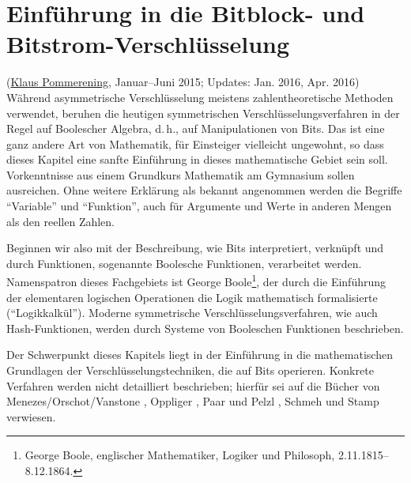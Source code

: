 \begin{refsegment}
\setcounter{satz}{0}
\setcounter{definition}{0}


\newpage %
\hypertarget{Chapter_BitCiphers}{}   %
\chapter{Einführung in die Bitblock- und Bitstrom-Verschlüsselung}
\label{Chapter_BitCiphers}
(\hyperlink{author_Klaus-Pommerening}{Klaus Pommerening},
 Januar--Juni 2015; Updates: Jan. 2016, Apr. 2016) \\

\noindent
Während asymmetrische Verschlüsselung meistens zahlentheoretische Methoden
verwendet, beruhen die heutigen symmetrischen
Verschlüsselungsverfahren
in der Regel auf Boolescher Algebra,
d.\,h., auf Manipulationen von Bits.
Das ist eine ganz andere Art von Mathematik, für Einsteiger vielleicht
ungewohnt, so dass dieses Kapitel eine sanfte Einführung in dieses mathematische
Gebiet sein soll. Vorkenntnisse aus einem Grundkurs Mathematik am Gymnasium
sollen ausreichen. Ohne weitere Erklärung als bekannt
angenommen werden die Begriffe "`Variable"' und "`Funktion"', auch für Argumente
und Werte in anderen Mengen als den reellen Zahlen.

Beginnen wir also mit der Beschreibung, wie Bits interpretiert, verknüpft
und durch Funktionen, sogenannte Boolesche
Funktionen, verarbeitet werden.
Namenspatron dieses Fachgebiets ist
George Boole\footnote{%
  George Boole, englischer Mathematiker, Logiker und Philosoph,
  2.11.1815--8.12.1864.
},
der durch die Einführung der elementaren logischen Operationen die Logik
mathematisch formalisierte ("`Logikkalkül"').
Moderne symmetrische Verschlüsselungsverfahren, wie auch
Hash-Funktionen,
werden durch Systeme von Booleschen Funktionen beschrieben.

Der Schwerpunkt dieses Kapitels liegt in der Einführung in die
mathematischen Grundlagen der Verschlüsselungstechniken, die auf
Bits operieren. Konkrete Verfahren werden nicht detailliert beschrieben;
hierfür sei auf die Bücher von
Menezes/Orschot/Vanstone \cite{Menezes2001},
Oppliger \cite{Oppliger2011},
Paar und Pelzl \cite{PaPe2009},
Schmeh \cite{Schm2003, Schm2016}
und Stamp \cite{Stamp2007} verwiesen.


\end{refsegment}

